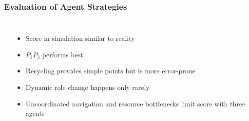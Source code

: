 \documentclass[]{beamer}
\begin{document}
\begin{frame}
  \frametitle{Evaluation of Agent Strategies} %
  \begin{columns}
    \begin{overlayarea}{\textwidth}{0.8\textheight}
    \center
    \\
    \\
    \raggedright
    \end{overlayarea}
    \begin{itemize}
    \item Score in simulation similar to reality %
      \pause
    \item $P_3P_3$ performs best %
      \pause
    \item Recycling provides simple points but is more error-prone
      \pause
    \item Dynamic role change happens only rarely
      \pause
    \item Uncoordinated navigation and resource bottlenecks limit score with three agents
    \end{itemize}
  \end{columns}
\end{frame}
\end{document}
